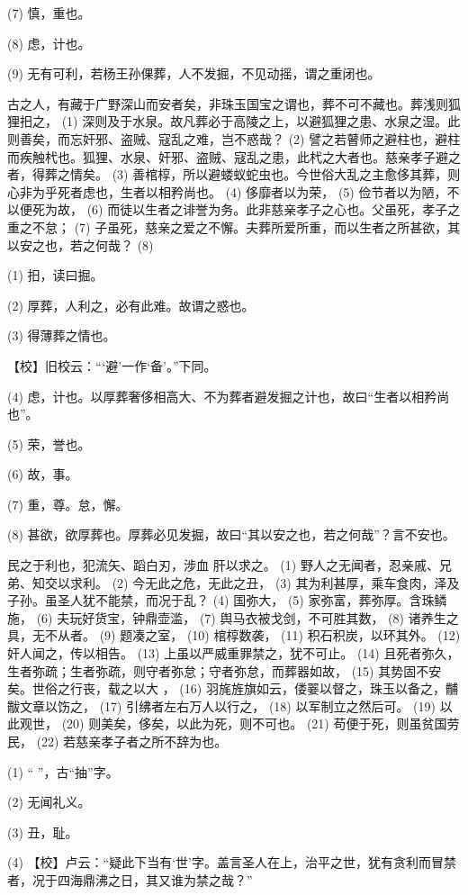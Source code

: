 \documentclass[12pt,UTF8]{ctexbook}
\begin{document}
(7) 慎，重也。

(8) 虑，计也。

(9) 无有可利，若杨王孙倮葬，人不发掘，不见动摇，谓之重闭也。

古之人，有藏于广野深山而安者矣，非珠玉国宝之谓也，葬不可不藏也。葬浅则狐狸抇之， (1) 深则及于水泉。故凡葬必于高陵之上，以避狐狸之患、水泉之湿。此则善矣，而忘奸邪、盗贼、寇乱之难，岂不惑哉？ (2) 譬之若瞽师之避柱也，避柱而疾触杙也。狐狸、水泉、奸邪、盗贼、寇乱之患，此杙之大者也。慈亲孝子避之者，得葬之情矣。 (3) 善棺椁，所以避蝼蚁蛇虫也。今世俗大乱之主愈侈其葬，则心非为乎死者虑也，生者以相矜尚也。 (4) 侈靡者以为荣， (5) 俭节者以为陋，不以便死为故， (6) 而徒以生者之诽誉为务。此非慈亲孝子之心也。父虽死，孝子之重之不怠； (7) 子虽死，慈亲之爱之不懈。夫葬所爱所重，而以生者之所甚欲，其以安之也，若之何哉？ (8)

(1) 抇，读曰掘。

(2) 厚葬，人利之，必有此难。故谓之惑也。

(3) 得薄葬之情也。

【校】旧校云：“‘避’一作‘备’。”下同。

(4) 虑，计也。以厚葬奢侈相高大、不为葬者避发掘之计也，故曰“生者以相矜尚也”。

(5) 荣，誉也。

(6) 故，事。

(7) 重，尊。怠，懈。

(8) 甚欲，欲厚葬也。厚葬必见发掘，故曰“其以安之也，若之何哉”？言不安也。

民之于利也，犯流矢、蹈白刃，涉血 肝以求之。 (1) 野人之无闻者，忍亲戚、兄弟、知交以求利。 (2) 今无此之危，无此之丑， (3) 其为利甚厚，乘车食肉，泽及子孙。虽圣人犹不能禁，而况于乱？ (4) 国弥大， (5) 家弥富，葬弥厚。含珠鳞施， (6) 夫玩好货宝，钟鼎壶滥， (7) 舆马衣被戈剑，不可胜其数， (8) 诸养生之具，无不从者。 (9) 题凑之室， (10) 棺椁数袭， (11) 积石积炭，以环其外。 (12) 奸人闻之，传以相告。 (13) 上虽以严威重罪禁之，犹不可止。 (14) 且死者弥久，生者弥疏；生者弥疏，则守者弥怠；守者弥怠，而葬器如故， (15) 其势固不安矣。世俗之行丧，载之以大 ， (16) 羽旄旌旗如云，偻翣以督之，珠玉以备之，黼黻文章以饬之， (17) 引绋者左右万人以行之， (18) 以军制立之然后可。 (19) 以此观世， (20) 则美矣，侈矣，以此为死，则不可也。 (21) 苟便于死，则虽贫国劳民， (22) 若慈亲孝子者之所不辞为也。

(1) “ ”，古“抽”字。

(2) 无闻礼义。

(3) 丑，耻。

(4) 【校】卢云：“疑此下当有‘世’字。盖言圣人在上，治平之世，犹有贪利而冒禁者，况于四海鼎沸之日，其又谁为禁之哉？”
\end{document}
